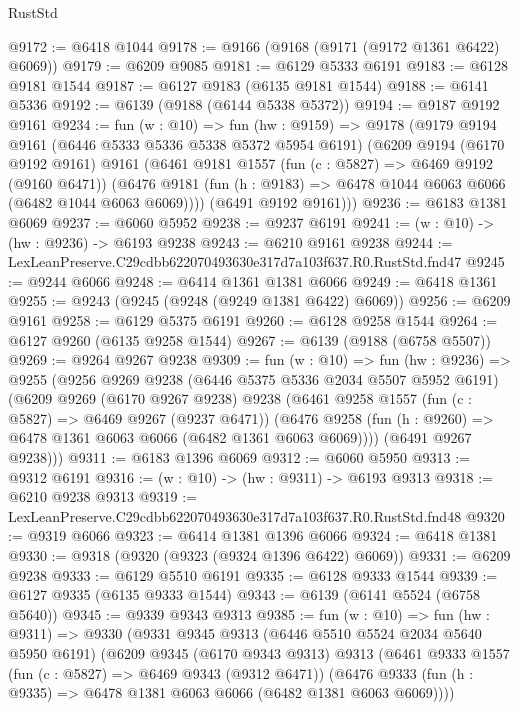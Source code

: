 \begin{lexlean}{RustStd}
\begin{coremodule}
@9172 := @6418 @1044
@9178 := @9166 (@9168 (@9171 (@9172 @1361 @6422) @6069))
@9179 := @6209 @9085
@9181 := @6129 @5333 @6191
@9183 := @6128 @9181 @1544
@9187 := @6127 @9183 (@6135 @9181 @1544)
@9188 := @6141 @5336
@9192 := @6139 (@9188 (@6144 @5338 @5372))
@9194 := @9187 @9192 @9161
@9234 := fun (w : @10) =>
  fun (hw : @9159) =>
  @9178
    (@9179
      @9194
      @9161
      (@6446 @5333 @5336 @5338 @5372 @5954 @6191)
      (@6209
        @9194
        (@6170 @9192 @9161)
        @9161
        (@6461
          @9181
          @1557
          (fun (c : @5827) => @6469 @9192 (@9160 @6471))
          (@6476 @9181 (fun (h : @9183) => @6478 @1044 @6063 @6066 (@6482 @1044 @6063 @6069))))
        (@6491 @9192 @9161)))
@9236 := @6183 @1381 @6069
@9237 := @6060 @5952
@9238 := @9237 @6191
@9241 := (w : @10) -> (hw : @9236) -> @6193 @9238
@9243 := @6210 @9161 @9238
@9244 := LexLeanPreserve.C29cdbb622070493630e317d7a103f637.R0.RustStd.fnd47
@9245 := @9244 @6066
@9248 := @6414 @1361 @1381 @6066
@9249 := @6418 @1361
@9255 := @9243 (@9245 (@9248 (@9249 @1381 @6422) @6069))
@9256 := @6209 @9161
@9258 := @6129 @5375 @6191
@9260 := @6128 @9258 @1544
@9264 := @6127 @9260 (@6135 @9258 @1544)
@9267 := @6139 (@9188 (@6758 @5507))
@9269 := @9264 @9267 @9238
@9309 := fun (w : @10) =>
  fun (hw : @9236) =>
  @9255
    (@9256
      @9269
      @9238
      (@6446 @5375 @5336 @2034 @5507 @5952 @6191)
      (@6209
        @9269
        (@6170 @9267 @9238)
        @9238
        (@6461
          @9258
          @1557
          (fun (c : @5827) => @6469 @9267 (@9237 @6471))
          (@6476 @9258 (fun (h : @9260) => @6478 @1361 @6063 @6066 (@6482 @1361 @6063 @6069))))
        (@6491 @9267 @9238)))
@9311 := @6183 @1396 @6069
@9312 := @6060 @5950
@9313 := @9312 @6191
@9316 := (w : @10) -> (hw : @9311) -> @6193 @9313
@9318 := @6210 @9238 @9313
@9319 := LexLeanPreserve.C29cdbb622070493630e317d7a103f637.R0.RustStd.fnd48
@9320 := @9319 @6066
@9323 := @6414 @1381 @1396 @6066
@9324 := @6418 @1381
@9330 := @9318 (@9320 (@9323 (@9324 @1396 @6422) @6069))
@9331 := @6209 @9238
@9333 := @6129 @5510 @6191
@9335 := @6128 @9333 @1544
@9339 := @6127 @9335 (@6135 @9333 @1544)
@9343 := @6139 (@6141 @5524 (@6758 @5640))
@9345 := @9339 @9343 @9313
@9385 := fun (w : @10) =>
  fun (hw : @9311) =>
  @9330
    (@9331
      @9345
      @9313
      (@6446 @5510 @5524 @2034 @5640 @5950 @6191)
      (@6209
        @9345
        (@6170 @9343 @9313)
        @9313
        (@6461
          @9333
          @1557
          (fun (c : @5827) => @6469 @9343 (@9312 @6471))
          (@6476 @9333 (fun (h : @9335) => @6478 @1381 @6063 @6066 (@6482 @1381 @6063 @6069))))

\end{coremodule}
\end{lexlean}
